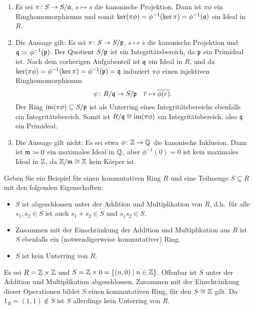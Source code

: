 \begin{solution}
  \begin{enumerate}
    \item
      Es sei $\pi \colon S \to S/\mathfrak{a}$, $s \mapsto \overline{s}$ die kanonische Projektion.
      Dann ist $\pi \phi$ ein Ringhomomorphismus und somit $\ker (\pi \phi) = \phi^{-1}(\ker \pi) = \phi^{-1}(\mathfrak{a})$ ein Ideal in $R$.
    \item
      Die Aussage gilt:
      Es sei $\pi \colon S \to S/\mathfrak{p}$, $s \mapsto \overline{s}$ die kanonische Projektion und $\mathfrak{q} \coloneqq \phi^{-1}(\mathfrak{p})$.
      Der Quotient $S/\mathfrak{p}$ ist ein Integritätsbereich, da $\mathfrak{p}$ ein Primideal ist.
      Nach dem vorherigen Aufgabenteil ist $\mathfrak{q}$ ein Ideal in $R$, und da $\ker (\pi \phi) = \phi^{-1}(\ker \pi) = \phi^{-1}(\mathfrak{p}) = \mathfrak{q}$ induziert $\pi \phi$ einen injektiven Ringhomomorphismus
      \[
        \psi \colon R/\mathfrak{q} \to S/\mathfrak{p}
        \quad
        \overline{r} \mapsto \overline{\phi(r)}.
      \]
      Der Ring $\operatorname{im} (\pi \phi) \subseteq S/\mathfrak{p}$ ist als Unterring eines Integritätsbereichs ebenfalls ein Integritätsbereich.
      Somit ist $R/\mathfrak{q} \cong \operatorname{im}(\pi \phi)$ ein Integritätsbereich, also $\mathfrak{q}$ ein Primideal.
    \item
      Die Aussage gilt nicht:
      Es sei etwa $\phi \colon \mathbb{Z} \to \mathbb{Q}$ die kanonische Inklusion.
      Dann ist $\mathfrak{m} \coloneqq 0$ ein maximales Ideal in $\mathbb{Q}$, aber $\phi^{-1}(0) = 0$ ist kein maximales Ideal in $\mathbb{Z}$, da $\mathbb{Z}/\mathfrak{m} \cong \mathbb{Z}$ kein Körper ist.
  \end{enumerate}
\end{solution}


\begin{question}
  Geben Sie ein Beispiel für einen kommutativen Ring $R$ und eine Teilmenge $S \subseteq R$ mit den folgenden Eigenschaften:
  \begin{itemize}
    \item
      $S$ ist abgeschlossen unter der Addition und Multiplikation von $R$, d.h.\ für alle $s_1, s_2 \in S$ ist auch $s_1 + s_2 \in S$ und $s_1 s_2 \in S$.
    \item
      Zusammen mit der Einschränkung der Addition und Multiplikation aus $R$ ist $S$ ebenfalls ein (notwendigerweise kommutativer) Ring.
    \item
      $S$ ist kein Unterring von $R$.
  \end{itemize}
\end{question}


\begin{solution}
  Es sei $R = \mathbb{Z} \times \mathbb{Z}$ und $S = \mathbb{Z} \times 0 = \{(n,0) \mid n \in \mathbb{Z}\}$.
  Offenbar ist $S$ unter der Addition und Multiplikation abgeschlossen.
  Zusammen mit der Einschränkung dieser Operationen bildet $S$ einen kommutativen Ring, für den $S \cong \mathbb{Z}$ gilt.
  Da $1_R = (1,1) \notin S$ ist $S$ allerdings kein Unterring von $R$.
\end{solution}
